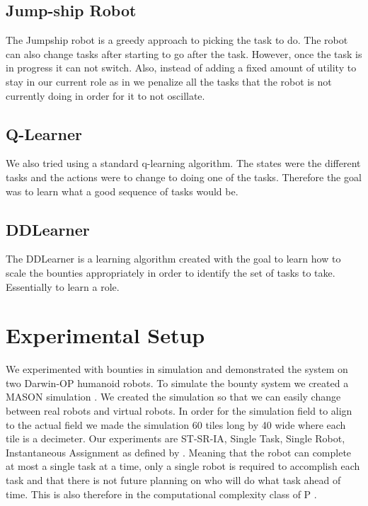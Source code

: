 \documentclass[twocolumn]{article}
\begin{document}
\subsection{Jump-ship Robot}
The Jumpship robot is a greedy approach to picking the task to do.  The robot can also change tasks after starting to go after the task.  However, once the task is in progress it can not switch.  Also, instead of adding a fixed amount of utility to stay in our current role as in \cite{Brusey2001} we penalize all the tasks that the robot is not currently doing in order for it to not oscillate.
\subsection{Q-Learner}
We also tried using a standard q-learning algorithm.  The states were the different tasks and the actions were to change to doing one of the tasks.  Therefore the goal was to learn what a good sequence of tasks would be.
\subsection{DDLearner}
The DDLearner is a learning algorithm created with the goal to learn how to scale the bounties appropriately in order to identify the set of tasks to take.  Essentially to learn a role.  


\section{Experimental Setup}

We experimented with bounties in simulation and demonstrated the system on two Darwin-OP humanoid robots.  To simulate the bounty system we created a MASON simulation \cite{Luke2003}.  We created the simulation so that we can easily change between real robots and virtual robots.  In order for the simulation field to align to the actual field we made the simulation 60 tiles long by 40 wide where each tile is a decimeter.  Our experiments are ST-SR-IA, Single Task, Single Robot, Instantaneous Assignment as defined by \cite{Gerkey2004}.  Meaning that the robot can complete at most a single task at a time, only a single robot is required to accomplish each task and that there is not future planning on who will do what task ahead of time.  This is also therefore in the computational complexity class of P \cite{Campbell2010, Gerkey2003}.

\end{document}
